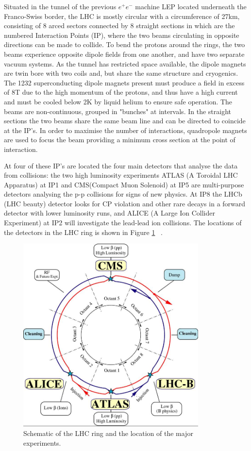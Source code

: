 Situated in the tunnel of the previous $e^{+}e^{-}$ machine LEP located underneath the Franco-Swiss border,  the LHC is mostly circular with a circumference of 27km, consisting of 8 arced sectors connected by 8 straight sections in which are the numbered Interaction Points (IP), where the two beams circulating in opposite directions can be made to collide. To bend the protons around the rings, the two beams experience opposite dipole fields from one another, and have two separate vacuum systems. As the tunnel has restricted space available, the dipole magnets are twin bore with two coils and, but share the same structure and cryogenics. The 1232 superconducting dipole magnets present must produce a field in excess of 8T due to the high momentum of the protons, and thus have a high current and must be cooled below 2K by liquid helium to ensure safe operation. The beams are non-continuous, grouped in "bunches" at intervals. In the straight sections the two beams share the same beam line and can be directed to coincide at the IP's. In order to maximise the number of interactions, quadropole magnets are used to focus the beam providing a minimum cross section at the point of interaction.

At four of these IP's are located the four main detectors that analyse the data from collisions: the two high luminosity experiments ATLAS (A Toroidal LHC Apparatus) at IP1 and CMS(Compact Muon Solenoid) at IP5 are multi-purpose detectors analysing the p-p collisions for signs of new physics. At IP8 the LHCb (LHC beauty) detector looks for CP violation and other rare decays in a forward detector with lower luminosity runs, and ALICE (A Large Ion Collider Experiment) at IP2 will investigate the lead-lead ion collisions. The locations of the detectors in the LHC ring is shown in Figure \ref{fig:LHC}~\cite{LHCConcept} .

\begin{figure}[htbp]
\centering
\includegraphics[width=0.85\textwidth]{Figures/Detector/lhc-schematic}
\caption{Schematic of the LHC ring and the location of the major experiments.}
\label{fig:LHC}
\end{figure}


